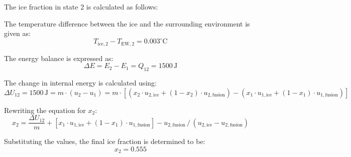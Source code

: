 The ice fraction in state 2 is calculated as follows:  

The temperature difference between the ice and the surrounding environment is given as:  
\[
T_{\text{ice},2} - T_{\text{EW},2} = 0.003^\circ\text{C}
\]  

The energy balance is expressed as:  
\[
\Delta E = E_2 - E_1 = Q_{12} = 1500 \, \text{J}
\]  

The change in internal energy is calculated using:  
\[
\Delta U_{12} = 1500 \, \text{J} = m \cdot (u_2 - u_1) = m \cdot \left[ (x_2 \cdot u_{2,\text{ice}} + (1 - x_2) \cdot u_{2,\text{fusion}}) - (x_1 \cdot u_{1,\text{ice}} + (1 - x_1) \cdot u_{1,\text{fusion}}) \right]
\]  

Rewriting the equation for \( x_2 \):  
\[
x_2 = \frac{\Delta U_{12}}{m} + \left[ x_1 \cdot u_{1,\text{ice}} + (1 - x_1) \cdot u_{1,\text{fusion}} \right] - u_{2,\text{fusion}} \, \bigg/ \, (u_{2,\text{ice}} - u_{2,\text{fusion}})
\]  

Substituting the values, the final ice fraction is determined to be:  
\[
x_2 = 0.555
\]